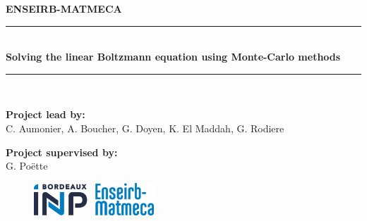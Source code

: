 \documentclass[a4paper, 11pt]{article}
\begin{document}
 
	
	
	
	\begin{titlepage} %
		\newcommand{\HRule}{\rule{\linewidth}{0.5mm}} %
		
		\centering %
		
		
		\textsc{\LARGE \textbf{ENSEIRB-MATMECA}}\\[1cm] %
		
		
		
		
		\vspace{5cm}
		
		\HRule\\[0.4cm]
		
		{\huge\bfseries\sffamily Solving the linear Boltzmann equation using Monte-Carlo methods \vspace{-0.4em}}\\[0.4cm] %
		\HRule\\[1.5cm]
		
		{\huge\bfseries }
		
		\bigskip
		\bigskip
		
		\centering
		\Large{\textbf{Project lead by:}} \\
		\Large{C. Aumonier, A. Boucher, G. Doyen, K. El Maddah, G. Rodiere}
		
		{\vspace{3em}\Large  \textbf{Project supervised by:}}\\
		\Large{G. Poëtte}
		
		\vfill
		
		\begin{figure}[H]
			\begin{center}
				\includegraphics[width=0.4\textwidth]{logo-embxinp.png}
			\end{center}
		\end{figure}
		

\end{titlepage}
\end{document}
